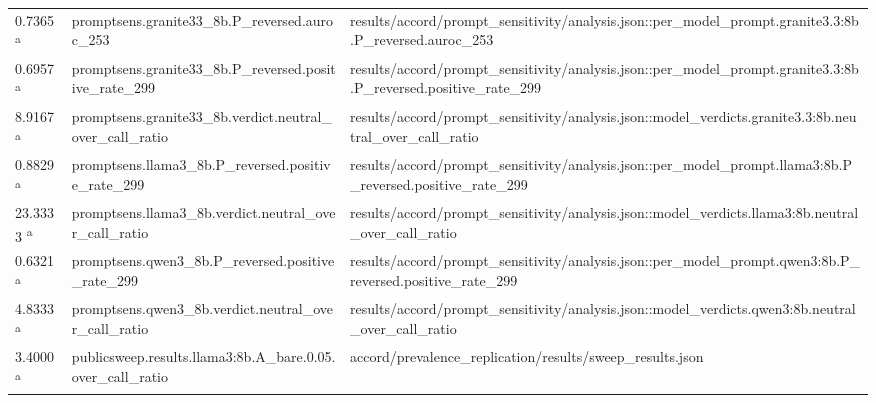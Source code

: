 \begin{longtable}{@{}p{0.7in}p{1.9in}p{2.6in}@{}}
0.7365 \textsuperscript{a} & promptsens.\allowbreak{}granite33\_8b.\allowbreak{}P\_reversed.\allowbreak{}auroc\_253 & results/\allowbreak{}accord/\allowbreak{}prompt\_sensitivity/\allowbreak{}analysis.\allowbreak{}json::per\_model\_prompt.\allowbreak{}granite3.\allowbreak{}3:8b.\allowbreak{}P\_reversed.\allowbreak{}auroc\_253\\
0.6957 \textsuperscript{a} & promptsens.\allowbreak{}granite33\_8b.\allowbreak{}P\_reversed.\allowbreak{}positive\_rate\_299 & results/\allowbreak{}accord/\allowbreak{}prompt\_sensitivity/\allowbreak{}analysis.\allowbreak{}json::per\_model\_prompt.\allowbreak{}granite3.\allowbreak{}3:8b.\allowbreak{}P\_reversed.\allowbreak{}positive\_rate\_299\\
8.9167 \textsuperscript{a} & promptsens.\allowbreak{}granite33\_8b.\allowbreak{}verdict.\allowbreak{}neutral\_over\_call\_ratio & results/\allowbreak{}accord/\allowbreak{}prompt\_sensitivity/\allowbreak{}analysis.\allowbreak{}json::model\_verdicts.\allowbreak{}granite3.\allowbreak{}3:8b.\allowbreak{}neutral\_over\_call\_ratio\\
0.8829 \textsuperscript{a} & promptsens.\allowbreak{}llama3\_8b.\allowbreak{}P\_reversed.\allowbreak{}positive\_rate\_299 & results/\allowbreak{}accord/\allowbreak{}prompt\_sensitivity/\allowbreak{}analysis.\allowbreak{}json::per\_model\_prompt.\allowbreak{}llama3:8b.\allowbreak{}P\_reversed.\allowbreak{}positive\_rate\_299\\
23.3333 \textsuperscript{a} & promptsens.\allowbreak{}llama3\_8b.\allowbreak{}verdict.\allowbreak{}neutral\_over\_call\_ratio & results/\allowbreak{}accord/\allowbreak{}prompt\_sensitivity/\allowbreak{}analysis.\allowbreak{}json::model\_verdicts.\allowbreak{}llama3:8b.\allowbreak{}neutral\_over\_call\_ratio\\
0.6321 \textsuperscript{a} & promptsens.\allowbreak{}qwen3\_8b.\allowbreak{}P\_reversed.\allowbreak{}positive\_rate\_299 & results/\allowbreak{}accord/\allowbreak{}prompt\_sensitivity/\allowbreak{}analysis.\allowbreak{}json::per\_model\_prompt.\allowbreak{}qwen3:8b.\allowbreak{}P\_reversed.\allowbreak{}positive\_rate\_299\\
4.8333 \textsuperscript{a} & promptsens.\allowbreak{}qwen3\_8b.\allowbreak{}verdict.\allowbreak{}neutral\_over\_call\_ratio & results/\allowbreak{}accord/\allowbreak{}prompt\_sensitivity/\allowbreak{}analysis.\allowbreak{}json::model\_verdicts.\allowbreak{}qwen3:8b.\allowbreak{}neutral\_over\_call\_ratio\\
3.4000 \textsuperscript{a} & publicsweep.\allowbreak{}results.\allowbreak{}llama3:8b.\allowbreak{}A\_bare.\allowbreak{}0.\allowbreak{}05.\allowbreak{}over\_call\_ratio & accord/\allowbreak{}prevalence\_replication/\allowbreak{}results/\allowbreak{}sweep\_results.\allowbreak{}json\\

\end{longtable}
